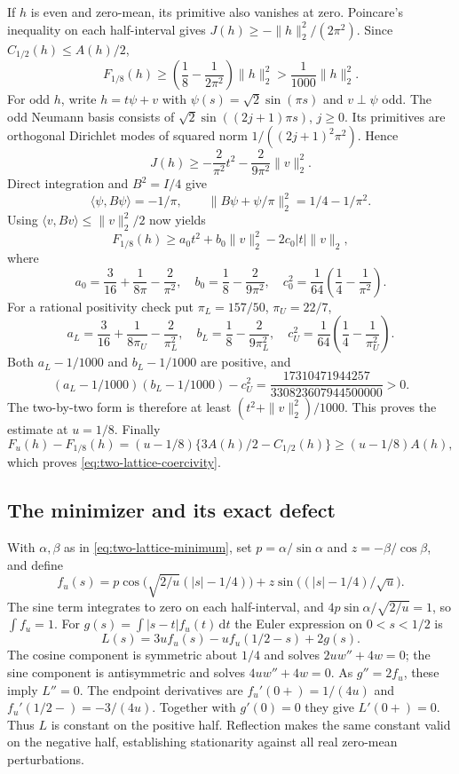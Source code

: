 \documentclass[11pt,reqno]{amsart}
\numberwithin{equation}{section}
\newcommand{\dd}{\,\mathrm d}
\begin{document}
If $h$ is even and zero-mean, its primitive also vanishes at zero.
Poincare's inequality on each half-interval gives
$J(h)\ge-\|h\|_2^2/(2\pi^2)$.
Since $C_{1/2}(h)\le A(h)/2$,
\[
 F_{1/8}(h)\ge
 \left(\frac18-\frac1{2\pi^2}\right)\|h\|_2^2
 >\frac1{1000}\|h\|_2^2.
\]
For odd $h$, write $h=t\psi+v$ with
$\psi(s)=\sqrt2\sin(\pi s)$ and $v\perp\psi$ odd.
The odd Neumann basis consists of
$\sqrt2\sin((2j+1)\pi s)$, $j\ge0$.
Its primitives are orthogonal Dirichlet modes of squared norm
$1/((2j+1)^2\pi^2)$. Hence
\[
 J(h)\ge-\frac2{\pi^2}t^2-\frac2{9\pi^2}\|v\|_2^2.
\]
Direct integration and $B^2=I/4$ give
\[
 \langle\psi,B\psi\rangle=-1/\pi,\qquad
 \|B\psi+\psi/\pi\|_2^2=1/4-1/\pi^2.
\]
Using $\langle v,Bv\rangle\le\|v\|_2^2/2$ now yields
\[
 F_{1/8}(h)\ge a_0t^2+b_0\|v\|_2^2-2c_0|t|\|v\|_2,
\]
where
\[
 a_0=\frac3{16}+\frac1{8\pi}-\frac2{\pi^2},\quad
 b_0=\frac18-\frac2{9\pi^2},\quad
 c_0^2=\frac1{64}\left(\frac14-\frac1{\pi^2}\right).
\]
For a rational positivity check put $\pi_L=157/50$, $\pi_U=22/7$,
\[
 a_L=\frac3{16}+\frac1{8\pi_U}-\frac2{\pi_L^2},\quad
 b_L=\frac18-\frac2{9\pi_L^2},\quad
 c_U^2=\frac1{64}\left(\frac14-\frac1{\pi_U^2}\right).
\]
Both $a_L-1/1000$ and $b_L-1/1000$ are positive, and
\[
 (a_L-1/1000)(b_L-1/1000)-c_U^2
 =\frac{17310471944257}{330823607944500000}>0.
\]
The two-by-two form is therefore at least
$(t^2+\|v\|_2^2)/1000$. This proves the estimate at $u=1/8$.
Finally
\[
 F_u(h)-F_{1/8}(h)
 =(u-1/8)\{3A(h)/2-C_{1/2}(h)\}
 \ge(u-1/8)A(h),
\]
which proves \eqref{eq:two-lattice-coercivity}.

\subsection{The minimizer and its exact defect}

With $\alpha,\beta$ as in \eqref{eq:two-lattice-minimum}, set
$p=\alpha/\sin\alpha$ and $z=-\beta/\cos\beta$, and define
\begin{equation}
 f_u(s)=p\cos\bigl(\sqrt{2/u}(|s|-1/4)\bigr)
       +z\sin\bigl((|s|-1/4)/\sqrt u\bigr).
 \label{eq:two-lattice-profile}
\end{equation}
The sine term integrates to zero on each half-interval, and
$4p\sin\alpha/\sqrt{2/u}=1$, so $\int f_u=1$.
For $g(s)=\int|s-t|f_u(t)\dd t$ the Euler expression on
$0<s<1/2$ is
\[
 L(s)=3u f_u(s)-u f_u(1/2-s)+2g(s).
\]
The cosine component is symmetric about $1/4$ and solves
$2u w''+4w=0$; the sine component is antisymmetric and solves
$4u w''+4w=0$. As $g''=2f_u$, these imply $L''=0$.
The endpoint derivatives are
$f_u'(0+)=1/(4u)$ and $f_u'(1/2-)=-3/(4u)$.
Together with $g'(0)=0$ they give $L'(0+)=0$.
Thus $L$ is constant on the positive half. Reflection makes the
same constant valid on the negative half, establishing
stationarity against all real zero-mean perturbations.
\end{document}
